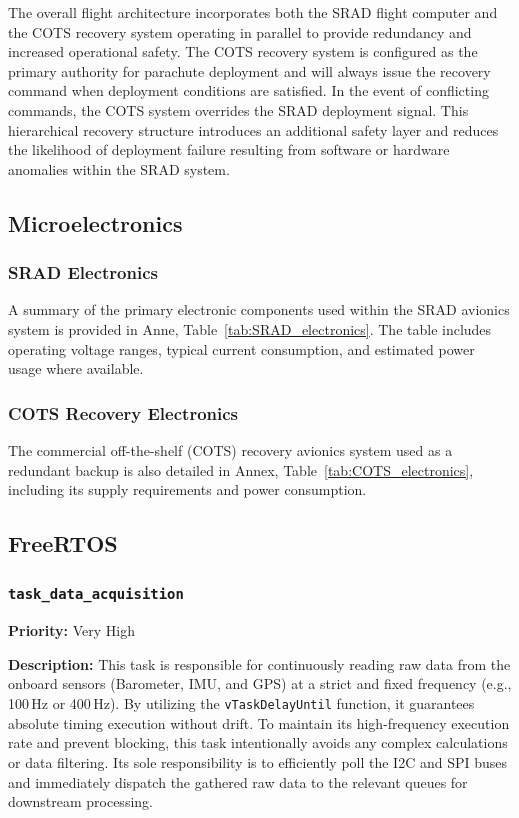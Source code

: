 The overall flight architecture incorporates both the SRAD flight computer and the COTS recovery system operating in parallel to provide redundancy and increased operational safety. The COTS recovery system is configured as the primary authority for parachute deployment and will always issue the recovery command when deployment conditions are satisfied. In the event of conflicting commands, the COTS system overrides the SRAD deployment signal. This hierarchical recovery structure introduces an additional safety layer and reduces the likelihood of deployment failure resulting from software or hardware anomalies within the SRAD system.

\subsection{Microelectronics}

\subsubsection{SRAD Electronics}

A summary of the primary electronic components used within the SRAD avionics system is provided in Anne, Table~\ref{tab:SRAD_electronics}. The table includes operating voltage ranges, typical current consumption, and estimated power usage where available.

\subsubsection{COTS Recovery Electronics}

The commercial off-the-shelf (COTS) recovery avionics system used as a redundant backup is also detailed in Annex, Table~\ref{tab:COTS_electronics}, including its supply requirements and power consumption.

\subsection{FreeRTOS}
\subsubsection{\texttt{task\_data\_acquisition}}

\textbf{Priority:} Very High

\textbf{Description:} This task is responsible for continuously reading raw data from the onboard sensors (Barometer, IMU, and GPS) at a strict and fixed frequency (e.g., 100\,Hz or 400\,Hz). By utilizing the \texttt{vTaskDelayUntil} function, it guarantees absolute timing execution without drift. To maintain its high-frequency execution rate and prevent blocking, this task intentionally avoids any complex calculations or data filtering. Its sole responsibility is to efficiently poll the I2C and SPI buses and immediately dispatch the gathered raw data to the relevant queues for downstream processing.


